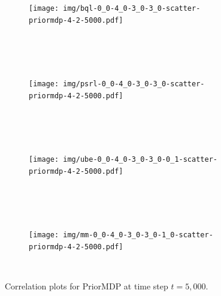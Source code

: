 \documentclass{article}
\begin{document}
\begin{appendices}
\begin{figure}[h!]
\centering
\begin{subfigure}{1.0\textwidth}
\texttt{[image: img/bql-0\_0-4\_0-3\_0-3\_0-scatter-priormdp-4-2-5000.pdf]}
\end{subfigure}\\
~\\
~\\
\begin{subfigure}{1.0\textwidth}
\texttt{[image: img/psrl-0\_0-4\_0-3\_0-3\_0-scatter-priormdp-4-2-5000.pdf]}
\end{subfigure}\\
~\\
~\\
\begin{subfigure}{1.0\textwidth}
\texttt{[image: img/ube-0\_0-4\_0-3\_0-3\_0-0\_1-scatter-priormdp-4-2-5000.pdf]}
\end{subfigure}\\
~\\
~\\
\begin{subfigure}{1.0\textwidth}
\texttt{[image: img/mm-0\_0-4\_0-3\_0-3\_0-1\_0-scatter-priormdp-4-2-5000.pdf]}
\end{subfigure}\\
\captionsetup{width=0.9\linewidth}
\caption{Correlation plots for PriorMDP at time step $t = 5,000$.}\label{correlations_priormdp_2500}
\end{figure}

\end{appendices}
\end{document}
